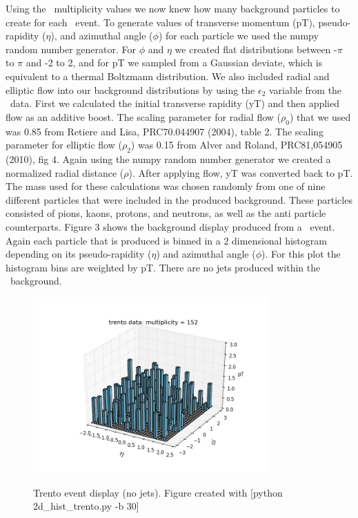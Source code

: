 \documentclass[11pt]{article}
\begin{document}
Using the \trento\ multiplicity values we now knew how many background particles to create for each \trento\ event. To generate values of transverse momentum (pT), pseudo-rapidity ($\eta$), and azimuthal angle ($\phi$) for each particle we used the numpy random number generator. For $\phi$  and $\eta$ we created flat distributions between -$\pi$ to $\pi$ and -2 to 2, and for pT we sampled from a Gaussian deviate, which is equivalent to a thermal Boltzmann distribution. We also included radial and elliptic flow into our background distributions by using the $\epsilon_2$ variable from the \trento\ data. First we calculated the initial transverse rapidity (yT) and then applied flow as an additive boost. The scaling parameter for radial flow ($\rho_0$) that we used was 0.85 from Retiere and Lisa, PRC70.044907 (2004), table 2.  The scaling parameter for elliptic flow ($\rho_2$) was 0.15 from Alver and Roland, PRC81,054905 (2010), fig 4. Again using the numpy random number generator we created a normalized radial distance ($\rho$). After applying flow, yT was converted back to pT. The mass used for these calculations was chosen randomly from one of nine different particles that were included in the produced background. These particles consisted of pions, kaons, protons, and neutrons, as well as the anti particle counterparts. Figure 3 shows the background display produced from a \trento\ event. Again each particle that is produced is binned in a 2 dimensional histogram depending on its pseudo-rapidity ($\eta$) and azimuthal angle ($\phi$). For this plot the histogram bins are weighted by pT. There are no jets produced within the \trento\ background.

\begin{figure}[h]
\begin{center}
\includegraphics[width=0.8\textwidth]{2d_hist_trento.png}
\label{fig_label}
\caption{Trento event display (no jets).  Figure created with [python 2d\_hist\_trento.py -b 30]}
\end{center}
\end{figure}
\end{document}
